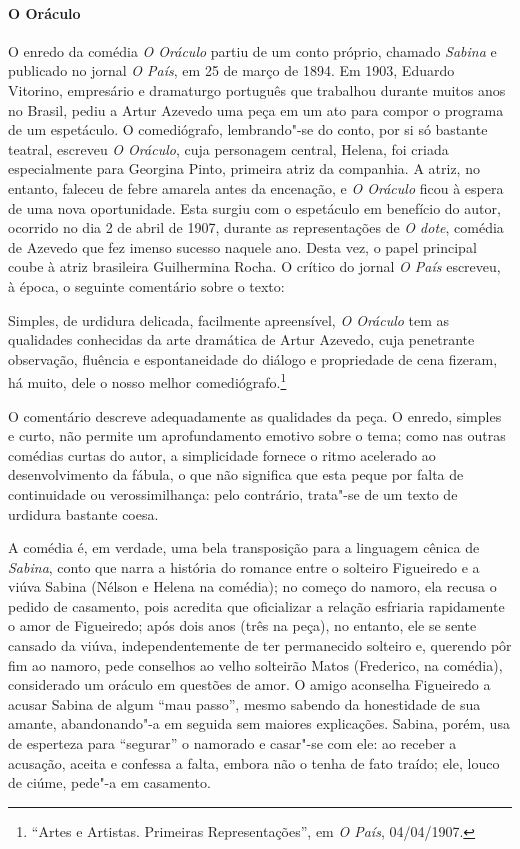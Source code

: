 \paragraph{O Oráculo}
O enredo da comédia \textit{O Oráculo} partiu de um conto próprio,
chamado \textit{Sabina} e publicado no jornal \textit{O País}, em 25 de
março de 1894. Em 1903, Eduardo Vitorino, empresário e dramaturgo
português que trabalhou durante muitos anos no Brasil, pediu a Artur
Azevedo uma peça em um ato para compor o programa de um espetáculo. O
comediógrafo, lembrando"-se do conto, por si só bastante teatral,
escreveu \textit{O Oráculo}, cuja personagem central, Helena, foi
criada especialmente para Georgina Pinto, primeira atriz da companhia.
A atriz, no entanto, faleceu de febre amarela antes da encenação, e
\textit{O Oráculo} ficou à espera de uma nova oportunidade. Esta surgiu
com o espetáculo em benefício do autor, ocorrido no dia 2 de abril de
1907, durante as representações de \textit{O dote}, comédia de Azevedo
que fez imenso sucesso naquele ano. Desta vez, o papel principal coube
à atriz brasileira Guilhermina Rocha. O crítico do jornal \textit{O
País} escreveu, à época, o seguinte comentário sobre o texto:

\begin{hedraquote} 
Simples, de urdidura delicada, facilmente apreensível, \textit{O Oráculo} tem 
as qualidades conhecidas da arte dramática de Artur Azevedo, cuja
penetrante observação, fluência e espontaneidade do diálogo e
propriedade de cena fizeram, há muito, dele o nosso melhor
comediógrafo.\footnote{ “Artes e Artistas. Primeiras Representações”,
em \textit{O País}, 04/04/1907.}
\end{hedraquote} 

O comentário descreve adequadamente as qualidades da peça. O enredo,
simples e curto, não permite um aprofundamento emotivo sobre o tema;
como nas outras comédias curtas do autor, a simplicidade fornece o
ritmo acelerado ao desenvolvimento da fábula, o que não significa que
esta peque por falta de continuidade ou verossimilhança: pelo
contrário, trata"-se de um texto de urdidura bastante coesa. 

A comédia é, em verdade, uma bela transposição para a linguagem cênica
de \textit{Sabina}, conto que narra a história do romance entre o
solteiro Figueiredo e a viúva Sabina (Nélson e Helena na comédia); no
começo do namoro, ela recusa o pedido de casamento, pois acredita que
oficializar a relação esfriaria rapidamente o amor de Figueiredo; após
dois anos (três na peça), no entanto, ele se sente cansado da viúva,
independentemente de ter permanecido solteiro e, querendo pôr fim ao
namoro, pede conselhos ao velho solteirão Matos (Frederico, na comédia),
considerado um oráculo em questões de amor. O amigo aconselha
Figueiredo a acusar Sabina de algum “mau passo”, mesmo sabendo da
honestidade de sua amante, abandonando"-a em seguida sem maiores
explicações. Sabina, porém, usa de esperteza para “segurar” o namorado
e casar"-se com ele: ao receber a acusação, aceita e confessa a falta,
embora não o tenha de fato traído; ele, louco de ciúme, pede"-a em
casamento.

